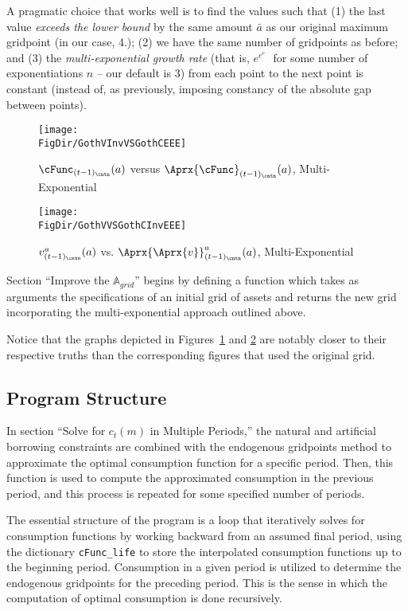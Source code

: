 A pragmatic choice that works well is to find the values such that (1) the last value \textit{exceeds the lower bound} by the same amount $\bar a$ as our original maximum gridpoint (in our case, 4.); (2) we have the same number of gridpoints as before; and (3) the \textit{multi-exponential growth rate} (that is, $e^{e^{e^{...}}}$ for some number of exponentiations $n$ -- our default is 3) from each point to the next point is constant (instead of, as previously, imposing constancy of the absolute gap between points).

\hypertarget{GothVInvVSGothCEEE}{}
\begin{figure}
  \centerline{\texttt{[image: \\FigDir/GothVInvVSGothCEEE]}}
  \caption{$\cFunc_{(t-1)_\cntn}(a)$ versus
    $\Aprx{\cFunc}_{(t-1)_\cntn}(a)$, Multi-Exponential }
  \label{fig:GothVInvVSGothCEE}
\end{figure}


\hypertarget{GothVVSGothCInvEEE}{}
\begin{figure}
  \texttt{[image: \\FigDir/GothVVSGothCInvEEE]}
  \caption{$v^{a}_{(t-1)_\cntn}(a)$ vs.
    $\Aprx{\Aprx{v}}_{(t-1)_\cntn}^{a}(a)$, Multi-Exponential }
  \label{fig:GothVVSGothCInvEE}
\end{figure}

Section ``Improve the $\mathbb{A}_{grid}$'' begins by defining a function which takes as arguments the specifications of an initial grid of assets and returns the new grid incorporating the multi-exponential approach outlined above.


Notice that the graphs depicted in Figures~\ref{fig:GothVInvVSGothCEE} and \ref{fig:GothVVSGothCInvEE} are notably closer to their respective truths than the corresponding figures that used the original grid.

\subsection{Program Structure}

In section ``Solve for $c_t(m)$ in Multiple Periods,'' the natural and artificial borrowing constraints are combined with the endogenous gridpoints method to approximate the optimal consumption function for a specific period. Then, this function is used to compute the approximated consumption in the previous period, and this process is repeated for some specified number of periods.

The essential structure of the program is a loop that iteratively solves for consumption functions by working backward from an assumed final period, using the dictionary \texttt{cFunc\_life} to store the interpolated consumption functions up to the beginning period. Consumption in a given period is utilized to determine the endogenous gridpoints for the preceding period. This is the sense in which the computation of optimal consumption is done recursively.

